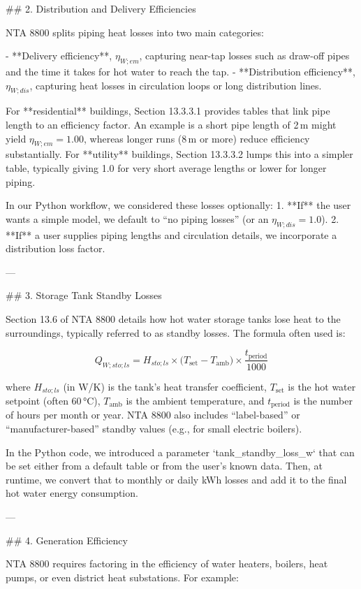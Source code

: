 ## 2. Distribution and Delivery Efficiencies

NTA 8800 splits piping heat losses into two main categories:

- **Delivery efficiency**, \(\eta_{W;em}\), capturing near-tap losses such as draw-off pipes and the time it takes for hot water to reach the tap.  
- **Distribution efficiency**, \(\eta_{W;dis}\), capturing heat losses in circulation loops or long distribution lines.

For **residential** buildings, Section 13.3.3.1 provides tables that link pipe length to an efficiency factor. An example is a short pipe length of 2 m might yield \(\eta_{W;em} = 1.00\), whereas longer runs (8 m or more) reduce efficiency substantially. For **utility** buildings, Section 13.3.3.2 lumps this into a simpler table, typically giving 1.0 for very short average lengths or lower for longer piping.

In our Python workflow, we considered these losses optionally:  
1. **If** the user wants a simple model, we default to “no piping losses” (or an \(\eta_{W;dis} = 1.0\)).  
2. **If** a user supplies piping lengths and circulation details, we incorporate a distribution loss factor.

---

## 3. Storage Tank Standby Losses

Section 13.6 of NTA 8800 details how hot water storage tanks lose heat to the surroundings, typically referred to as standby losses. The formula often used is:

\[
Q_{W;sto;ls} = H_{sto;ls} \times \bigl(T_{\text{set}} - T_{\text{amb}}\bigr) \times \frac{t_{\text{period}}}{1000}
\]

where \(H_{sto;ls}\) (in W/K) is the tank’s heat transfer coefficient, \(T_{\text{set}}\) is the hot water setpoint (often 60 °C), \(T_{\text{amb}}\) is the ambient temperature, and \(t_{\text{period}}\) is the number of hours per month or year. NTA 8800 also includes “label-based” or “manufacturer-based” standby values (e.g., for small electric boilers).

In the Python code, we introduced a parameter `tank_standby_loss_w` that can be set either from a default table or from the user’s known data. Then, at runtime, we convert that to monthly or daily kWh losses and add it to the final hot water energy consumption.

---

## 4. Generation Efficiency

NTA 8800 requires factoring in the efficiency of water heaters, boilers, heat pumps, or even district heat substations. For example:

